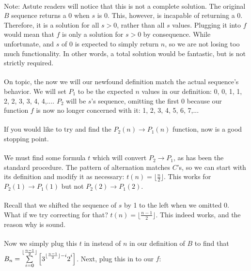 \documentclass[12pt,letterpaper]{article}
\begin{document}
			\paragraph{} Note: Astute readers will notice that this is not a complete solution. The original $B$ sequence returns a 0 when $s$ is 0. This, however, is incapable of returning a 0. Therefore, it is a solution for all $s > 0$, rather than all $s$ values. Plugging it into $f$ would mean that $f$ is only a solution for $s > 0$ by consequence. While unfortunate, and $s$ of 0 is expected to simply return $n$, so we are not losing too much functionality. In other words, a total solution would be fantastic, but is not strictly required.
			
			\paragraph{} On topic, the now we will our newfound definition match the actual sequence's behavior. We will set $P_1$ to be the expected $n$ values in our definition: 0, 0, 1, 1, 2, 2, 3, 3, 4, 4,.... $P_2$ will be $s$'s sequence, omitting the first 0 because our function $f$ is now no longer concerned with it: 1, 2, 3, 4, 5, 6, 7,...
			
			\paragraph{} If you would like to try and find the $P_2(n) \rightarrow P_1(n)$ function, now is a good stopping point.
			
			\paragraph{} We must find some formula $t$ which will convert $P_2 \rightarrow P_1$, as has been the standard procedure. The pattern of alternation matches $C$'s, so we can start with its definition and modify it as necessary: $t(n) = \lfloor \frac{n}{2} \rfloor$. This works for $P_2(1) \rightarrow P_1(1)$ but not $P_2(2) \rightarrow P_1(2)$. 
			
			\paragraph{} Recall that we shifted the sequence of $s$ by 1 to the left when we omitted 0. What if we try correcting for that? $t(n) = \lfloor \frac{n-1}{2} \rfloor $. This indeed works, and the reason why is sound.
			
			\paragraph{} Now we simply plug this $t$ in instead of $n$ in our definition of $B$ to find that $B_n = \sum\limits_{i=0}^{\lfloor \frac{n-1}{2} \rfloor} \left[3\strut^{\lfloor \frac{n-1}{2} \rfloor - i}2\strut^i \right]$. Next, plug this in to our $f$:
			
\end{document}
